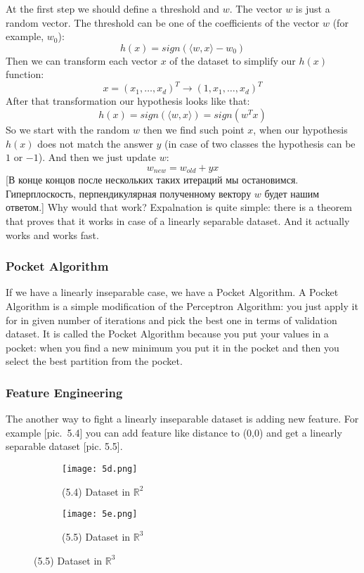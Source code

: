 At the first step we should define a threshold and $w$. The vector $w$ is just a random vector. The threshold can be one of the coefficients of the vector $w$ (for example, $w_0$):
$$h(x)=sign\left(\langle w,x\rangle-w_0\right)$$
Then we can transform each vector $x$ of the dataset to simplify our $h(x)$ function: $$x=(x_1,\ldots,x_d)^T\to(1, x_1, \ldots, x_d)^T$$ After that transformation our hypothesis looks like that:
$$h(x)=sign\left(\langle w, x\rangle\right)=sign(w^Tx)$$
So we start with the random $w$ then we find such point $x$, when our hypothesis $h(x)$ does not match the answer $y$ (in case of two classes the hypothesis can be $1$ or $-1$). And then we just update $w$:
$$w_{new}=w_{old}+yx$$
[В конце концов после нескольких таких итераций мы остановимся. Гиперплоскость, перпендикулярная полученному вектору $w$ будет нашим ответом.]
Why would that work? Expalnation is quite simple: there is a theorem  that proves that it works in case of a linearly separable dataset. {\it <Some intuition about proof of this theorem>} And it actually works and works fast.

\subsubsection*{Pocket Algorithm}

If we have a linearly inseparable case, we have a Pocket Algorithm. {\it <An example with handwritten digits dataset>} A Pocket Algorithm is a simple modification of the Perceptron Algorithm: you just apply it for in given number of iterations and pick the best one in terms of validation dataset. It is called the Pocket Algorithm because you put your values in a pocket: when you find a new minimum you put it in the pocket and then you select the best partition from the pocket.

\subsubsection*{Feature Engineering}

The another way to fight a linearly inseparable dataset is adding new feature. For example [pic.~5.4] you can add feature like distance to (0,0) and get a linearly separable dataset [pic. 5.5].
\begin{figure}[h!]
  \centering
  \begin{subfigure}[l]{0.353\linewidth}
    \texttt{[image: 5d.png]}
    \caption*{(5.4) Dataset in $\mathbb{R}^2$}
  \end{subfigure}
  \hspace{2cm}
  \begin{subfigure}[r]{0.4\linewidth}
    \texttt{[image: 5e.png]}
    \caption*{(5.5) Dataset in $\mathbb{R}^3$}
  \end{subfigure}
\end{figure}

